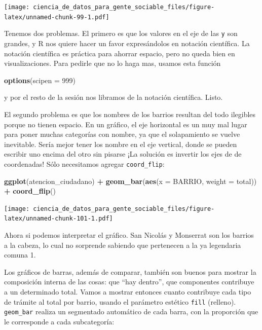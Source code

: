 \documentclass[spanish,]{book}
\newenvironment{Shaded}{\begin{snugshade}}{\end{snugshade}}
\newcommand{\DataTypeTok}[1]{\textcolor[rgb]{0.13,0.29,0.53}{#1}}
\newcommand{\DecValTok}[1]{\textcolor[rgb]{0.00,0.00,0.81}{#1}}
\newcommand{\KeywordTok}[1]{\textcolor[rgb]{0.13,0.29,0.53}{\textbf{#1}}}
\newcommand{\NormalTok}[1]{#1}
\newcommand{\OperatorTok}[1]{\textcolor[rgb]{0.81,0.36,0.00}{\textbf{#1}}}
\newcommand{\StringTok}[1]{\textcolor[rgb]{0.31,0.60,0.02}{#1}}
\begin{document}
\texttt{[image: ciencia\_de\_datos\_para\_gente\_sociable\_files/figure-latex/unnamed-chunk-99-1.pdf]}

Tenemos dos problemas. El primero es que los valores en el eje de las \texttt{y} son grandes, y R nos quiere hacer un favor expresándolos en notación científica. La notación científica es práctica para ahorrar espacio, pero no queda bien en visualizaciones. Para pedirle que no lo haga mas, usamos esta función

\begin{Shaded}
\begin{Highlighting}[]
\KeywordTok{options}\NormalTok{(}\DataTypeTok{scipen =} \DecValTok{999}\NormalTok{)}
\end{Highlighting}
\end{Shaded}

y por el resto de la sesión nos libramos de la notación científica. Listo.

El segundo problema es que los nombres de los barrios resultan del todo ilegibles porque no tienen espacio. En un gráfico, el eje horizontal es un muy mal lugar para poner muchas categorías con nombre, ya que el solapamiento se vuelve inevitable. Sería mejor tener los nombre en el eje vertical, donde se pueden escribir uno encima del otro sin pisarse ¡La solución es invertir los ejes de de coordenadas! Sólo necesitamos agregar \texttt{coord\_flip}:

\begin{Shaded}
\begin{Highlighting}[]
\KeywordTok{ggplot}\NormalTok{(atencion_ciudadano) }\OperatorTok{+}
\StringTok{    }\KeywordTok{geom_bar}\NormalTok{(}\KeywordTok{aes}\NormalTok{(}\DataTypeTok{x =}\NormalTok{ BARRIO, }\DataTypeTok{weight =}\NormalTok{ total)) }\OperatorTok{+}
\StringTok{    }\KeywordTok{coord_flip}\NormalTok{()}
\end{Highlighting}
\end{Shaded}

\texttt{[image: ciencia\_de\_datos\_para\_gente\_sociable\_files/figure-latex/unnamed-chunk-101-1.pdf]}

Ahora si podemos interpretar el gráfico. San Nicolás y Monserrat son los barrios a la cabeza, lo cual no sorprende sabiendo que pertenecen a la ya legendaria comuna 1.

Los gráficos de barras, además de comparar, también son buenos para mostrar la composición interna de las cosas: que ``hay dentro'', que componentes contribuye a un determinado total. Vamos a mostrar entonces cuanto contribuye cada tipo de trámite al total por barrio, usando el parámetro estético \texttt{fill} (relleno). \texttt{geom\_bar} realiza un segmentado automático de cada barra, con la proporción que le corresponde a cada subcategoría:
\end{document}
